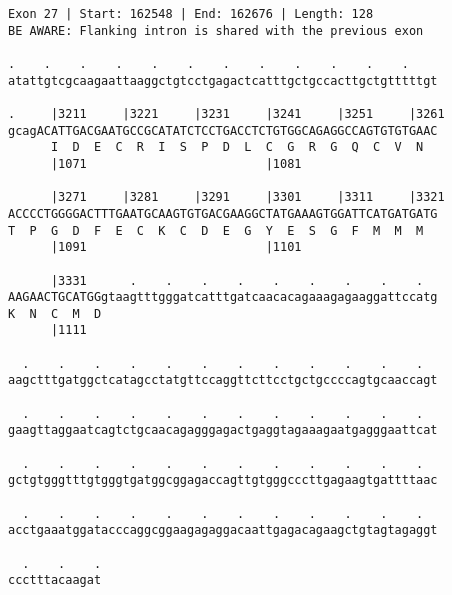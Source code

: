 \documentclass{article}
\begin{document}
\begin{Verbatim}
Exon 27 | Start: 162548 | End: 162676 | Length: 128
BE AWARE: Flanking intron is shared with the previous exon
 
.    .    .    .    .    .    .    .    .    .    .    .    
atattgtcgcaagaattaaggctgtcctgagactcatttgctgccacttgctgtttttgt
  
.     |3211     |3221     |3231     |3241     |3251     |3261
gcagACATTGACGAATGCCGCATATCTCCTGACCTCTGTGGCAGAGGCCAGTGTGTGAAC
      I  D  E  C  R  I  S  P  D  L  C  G  R  G  Q  C  V  N  
      |1071                         |1081                   
  
      |3271     |3281     |3291     |3301     |3311     |3321
ACCCCTGGGGACTTTGAATGCAAGTGTGACGAAGGCTATGAAAGTGGATTCATGATGATG
T  P  G  D  F  E  C  K  C  D  E  G  Y  E  S  G  F  M  M  M  
      |1091                         |1101                   
  
      |3331      .    .    .    .    .    .    .    .    .  
AAGAACTGCATGGgtaagtttgggatcatttgatcaacacagaaagagaaggattccatg
K  N  C  M  D                                               
      |1111                                                 
  
  .    .    .    .    .    .    .    .    .    .    .    .  
aagctttgatggctcatagcctatgttccaggttcttcctgctgccccagtgcaaccagt
  
  .    .    .    .    .    .    .    .    .    .    .    .  
gaagttaggaatcagtctgcaacagagggagactgaggtagaaagaatgagggaattcat
  
  .    .    .    .    .    .    .    .    .    .    .    .  
gctgtgggtttgtgggtgatggcggagaccagttgtgggcccttgagaagtgattttaac
  
  .    .    .    .    .    .    .    .    .    .    .    .  
acctgaaatggatacccaggcggaagagaggacaattgagacagaagctgtagtagaggt
  
  .    .    .
ccctttacaagat
\end{Verbatim}
\newpage
\end{document}
